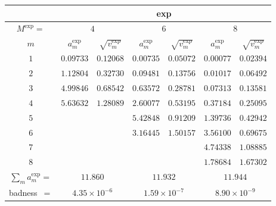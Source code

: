 \begin{tabular}{c|cc|cc|cc|}
&
\multicolumn{6}{|c|}{exp} \\
\hline
$M^{\exp}=$ &
 \multicolumn{2}{|c|}{$4$} &
 \multicolumn{2}{|c|}{$6$} &
 \multicolumn{2}{|c|}{$8$} \\
$m$ &
 $a^{\exp}_m$ & $\sqrt{v^{\exp}_m}$ &
 $a^{\exp}_m$ & $\sqrt{v^{\exp}_m}$ &
 $a^{\exp}_m$ & $\sqrt{v^{\exp}_m}$ \\
$1$ &
 $0.09733$ & $0.12068$ &
 $0.00735$ & $0.05072$ &
 $0.00077$ & $0.02394$ \\
$2$ &
 $1.12804$ & $0.32730$ &
 $0.09481$ & $0.13756$ &
 $0.01017$ & $0.06492$ \\
$3$ &
 $4.99846$ & $0.68542$ &
 $0.63572$ & $0.28781$ &
 $0.07313$ & $0.13581$ \\
$4$ &
 $5.63632$ & $1.28089$ &
 $2.60077$ & $0.53195$ &
 $0.37184$ & $0.25095$ \\
$5$ &
 $~$ & $~$ &
 $5.42848$ & $0.91209$ &
 $1.39736$ & $0.42942$ \\
$6$ &
 $~$ & $~$ &
 $3.16445$ & $1.50157$ &
 $3.56100$ & $0.69675$ \\
$7$ &
 $~$ & $~$ &
 $~$ & $~$ &
 $4.74338$ & $1.08885$ \\
$8$ &
 $~$ & $~$ &
 $~$ & $~$ &
 $1.78684$ & $1.67302$ \\
\hline
$\sum_m a^{\exp}_m=$ &
 \multicolumn{2}{|c|}{$11.860$} &
 \multicolumn{2}{|c|}{$11.932$} &
 \multicolumn{2}{|c|}{$11.944$} \\
badness~$=$ &
 \multicolumn{2}{|c|}{$4.35\times 10^{-6}$} &
 \multicolumn{2}{|c|}{$1.59\times 10^{-7}$} &
 \multicolumn{2}{|c|}{$8.90\times 10^{-9}$} \\
\end{tabular}
